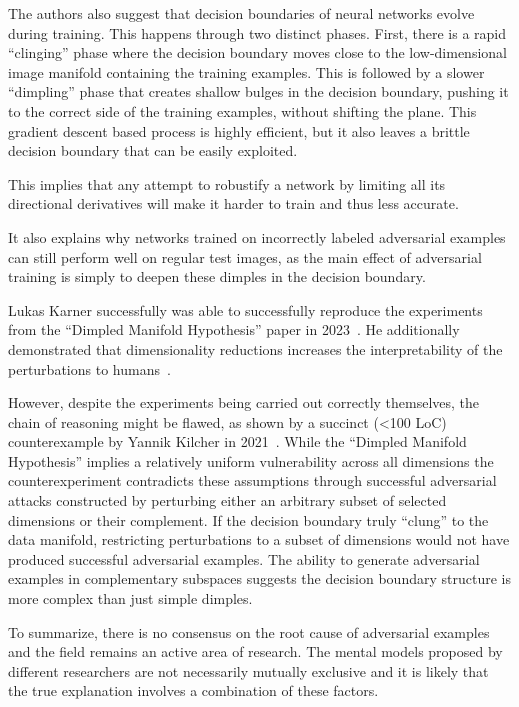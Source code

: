 \documentclass[a4paper, oneside]{discothesis}
\begin{document}
The authors also suggest that decision boundaries of neural networks evolve during training. This happens through two distinct phases. First, there is a rapid ``clinging'' phase where the decision boundary moves close to the low-dimensional image manifold containing the training examples. This is followed by a slower ``dimpling'' phase that creates shallow bulges in the decision boundary, pushing it to the correct side of the training examples, without shifting the plane. This gradient descent based process is highly efficient, but it also leaves a brittle decision boundary that can be easily exploited.

This implies that any attempt to robustify a network by limiting all its directional derivatives will make it harder to train and thus less accurate.

It also explains why networks trained on incorrectly labeled adversarial examples can still perform well on regular test images, as the main effect of adversarial training is simply to deepen these dimples in the decision boundary.

Lukas Karner successfully was able to successfully reproduce the experiments from the ``Dimpled Manifold Hypothesis'' paper in 2023~\cite{karner2023dimpled}. He additionally demonstrated that dimensionality reductions increases the interpretability of the perturbations to humans~\cite{karner2023dimpled}.

However, despite the experiments being carried out correctly themselves, the chain of reasoning might be flawed, as shown by a succinct (<100 LoC) counterexample by Yannik Kilcher in 2021~\cite{kilcher2021dimpledcode, kilcher2021dimpled}. While the ``Dimpled Manifold Hypothesis'' implies a relatively uniform vulnerability across all dimensions the counterexperiment contradicts these assumptions through successful adversarial attacks constructed by perturbing either an arbitrary subset of selected dimensions or their complement. If the decision boundary truly ``clung'' to the data manifold, restricting perturbations to a subset of dimensions would not have produced successful adversarial examples. The ability to generate adversarial examples in complementary subspaces suggests the decision boundary structure is more complex than just simple dimples.

To summarize, there is no consensus on the root cause of adversarial examples and the field remains an active area of research. The mental models proposed by different researchers are not necessarily mutually exclusive and it is likely that the true explanation involves a combination of these factors.
\end{document}
